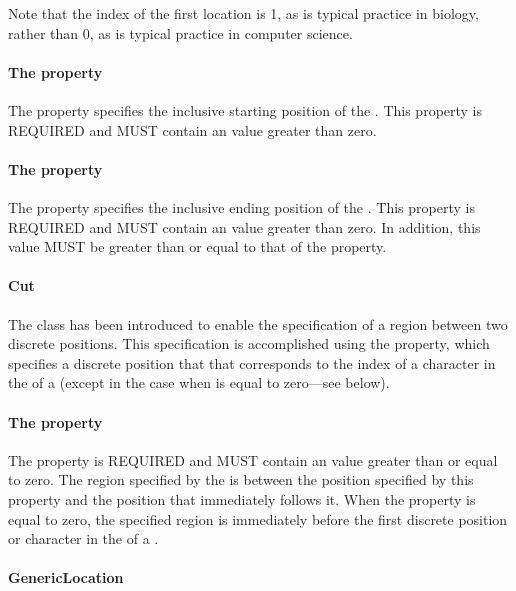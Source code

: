 Note that the index of the first location is 1, as is typical practice in biology, rather than 0, as is typical practice in computer science.

\paragraph{The  property}\label{sec:start}
The  property specifies the inclusive starting position of the . This property is REQUIRED and MUST contain an  value greater than zero.

\paragraph{The  property}\label{sec:end}
The  property specifies the inclusive ending position of the . This property is REQUIRED and MUST contain an  value greater than zero. In addition, this  value MUST be greater than or equal to that of the  property.

\paragraph{Cut}
\label{sec:Cut}
The  class has been introduced to enable the specification of a region between two discrete positions.
This specification is accomplished using the  property, which specifies a discrete position that that corresponds to the index of a character in the   of a  (except in the case when  is equal to zero---see below).

\paragraph{The  property}
\label{sec:at}
The  property is REQUIRED and MUST contain an  value greater than or equal to zero. The region specified by the  is between the position specified by this property and the position that immediately follows it. When the  property is equal to zero, the specified region is immediately before the first discrete position or character in the   of a .

\paragraph{GenericLocation}
\label{sec:GenericLocation}

